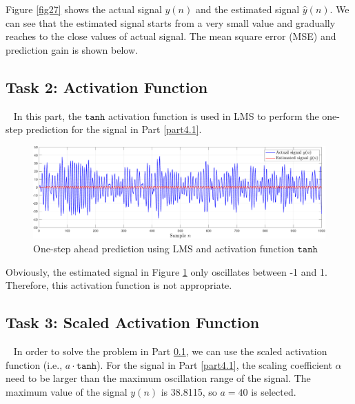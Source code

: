 \documentclass[10pt]{article}
\begin{document}
Figure \ref{fig27} shows the actual signal $y(n)$ and the estimated signal $\hat{y}(n)$.
We can see that the estimated signal starts from a very small value and gradually 
reaches to the close values of actual signal. The mean square error (MSE) and prediction gain 
is shown below.

\begin{table}[htbp]
	\caption{LMS one-step ahead prediction}
	\centering
\end{table}

\subsection{Task 2: Activation Function} \label{part4.2}
\ \indent
In this part, the $\mathtt{tanh}$ activation function is used in LMS to 
perform the one-step prediction for the signal in Part \ref{part4.1}.

\begin{figure}[htbp]
    \centering
	\includegraphics[width=1\textwidth]{fig/4.2_1.pdf}

    \caption{One-step ahead prediction using LMS and activation function $\mathtt{tanh}$}
    \label{fig28}
\end{figure}

Obviously, the estimated signal in Figure \ref{fig28} only oscillates between -1 and 1. 
Therefore, this activation function is not appropriate.

\subsection{Task 3: Scaled Activation Function}
\ \indent
In order to solve the problem in Part \ref{part4.2}, we can use the scaled activation 
function (i.e., $a \cdot \mathtt{tanh}$). For the signal in Part \ref{part4.1},
the scaling coefficient $\alpha$ need to be larger than the maximum oscillation range 
of the signal. The maximum value of the signal $y(n)$ is 38.8115, so
$a = 40$ is selected.
\end{document}
